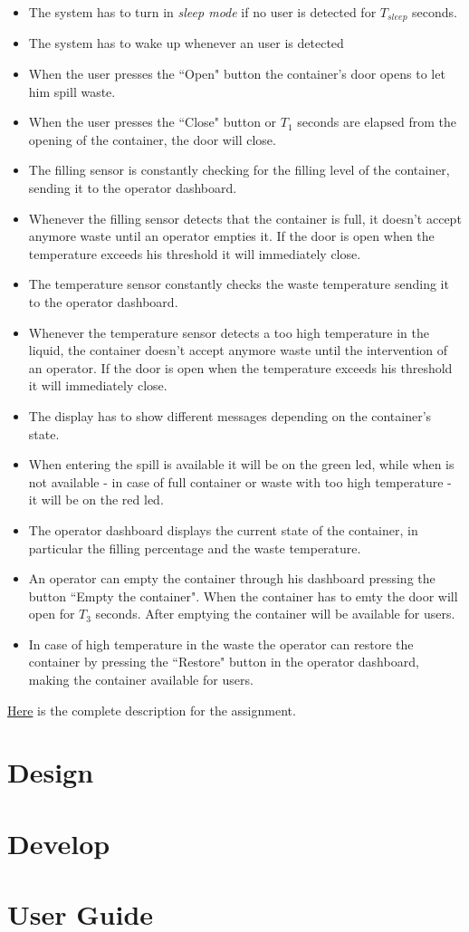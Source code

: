 \documentclass[a4paper,12pt]{report}
\begin{document}
        \begin{itemize}
            \item The system has to turn in \textit{sleep mode} if no user is detected for $T_
            {sleep}$ seconds. 
            \item The system has to wake up whenever an user is detected
            \item When the user presses the ``Open" button the container's door opens to let him spill waste.
            \item When the user presses the ``Close" button or $T_1$ seconds are elapsed from the opening of the container, the door will close. 
            \item The filling sensor is constantly checking for the filling level of the container, sending it to the operator dashboard. 
            \item Whenever the filling sensor detects that the container is full, it doesn't accept anymore waste until an operator empties it. If the door is open when the temperature exceeds his threshold it will immediately close. 
            \item The temperature sensor constantly checks the waste temperature sending it to the operator dashboard. 
            \item Whenever the temperature sensor detects a too high temperature in the liquid, the container doesn't accept anymore waste until the intervention of an operator. If the door is open when the temperature exceeds his threshold it will immediately close. 
            \item The display has to show different messages depending on the container's state. 
            \item When entering the spill is available it will be on the green led, while when is not available - in case of full container or waste with too high temperature - it will be on the red led.  
            \item The operator dashboard displays the current state of the container, in particular the filling percentage and the waste temperature. 
            \item An operator can empty the container through his dashboard pressing the button ``Empty the container". When the container has to emty the door will open for $T_3$ seconds. After emptying the container will be available for users. 
            \item In case of high temperature in the waste the operator can restore the container by pressing the ``Restore" button in the operator dashboard, making the container available for users.  
        \end{itemize}
        
    \centerline{\href{https://docs.google.com/document/d/1iFXGmo7RVZMpJ5bxUN5ms_qFqg2B-wecRc0sfas9rQ4/edit?tab=t.0}{Here} is the complete description for the assignment.}

\chapter{Design}

\chapter{Develop}

\appendix
\chapter{User Guide}
\end{document}
